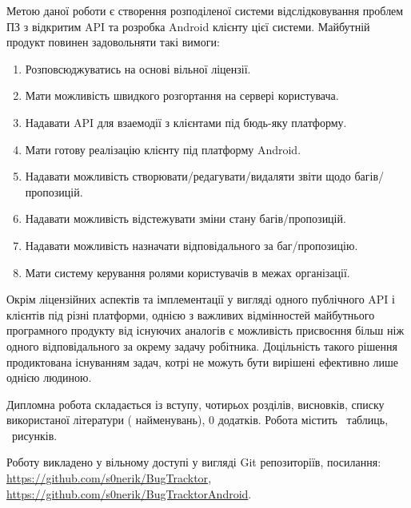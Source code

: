 \documentclass[../main.tex]{subfiles}
\begin{document}
Метою даної роботи є створення розподіленої системи відслідковування проблем ПЗ з відкритим API та розробка Android клієнту цієї системи. Майбутній продукт повинен задовольняти такі вимоги:
\begin{enumerate}
\item Розповсюджуватись на основі вільної ліцензії.
\item Мати можливість швидкого розгортання на сервері користувача.
\item Надавати API для взаемодії з клієнтами під бюдь-яку платформу.
\item Мати готову реалізацію клієнту під платформу Android.
\item Надавати можливість створювати/редагувати/видаляти звіти щодо багів/пропозицій.
\item Надавати можливість відстежувати зміни стану багів/пропозицій.
\item Надавати можливість назначати відповідального за баг/пропозицію.
\item Мати систему керування ролями користувачів в межах організації.
\end{enumerate}

Окрім ліцензійних аспектів та імплементації у вигляді одного публічного API і клієнтів під різні платформи, однією з важливих відмінностей майбутнього програмного продукту від існуючих аналогів є можливість присвоєння більш ніж одного відповідального за окрему задачу робітника. Доцільність такого рішення продиктована існуванням задач, котрі не можуть бути вирішені ефективно лише однією людиною.

Дипломна робота складається із вступу, чотирьох розділів, висновків, списку використаної літератури ( найменувань), 0 додатків. Робота містить \totaltables\ таблиць, \totalfigures\  рисунків.

Роботу викладено у вільному доступі у вигляді Git репозиторіїв, посилання: \url{https://github.com/s0nerik/BugTracktor}, \url{https://github.com/s0nerik/BugTracktorAndroid}.
\end{document}
